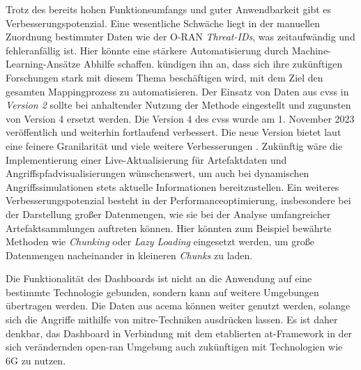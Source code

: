Trotz des bereits hohen Funktionsumfangs und guter Anwendbarkeit gibt es Verbesserungspotenzial. Eine wesentliche Schwäche liegt in der manuellen Zuordnung bestimmter Daten wie der O-RAN \textit{Threat-IDs}, was zeitaufwändig und fehleranfällig ist. Hier könnte eine stärkere Automatisierung durch Machine-Learning-Ansätze Abhilfe schaffen. \citeauthor{klementSecuring6GTransition2024} kündigen ihn \autocite{klementSecuring6GTransition2024} an, dass sich ihre zukünftigen Forschungen stark mit diesem Thema beschäftigen wird, mit dem Ziel den gesamten Mappingprozess zu automatisieren. Der Einsatz von Daten aus \gls{cvss} in \textit{Version 2} sollte bei anhaltender Nutzung der Methode eingestellt und zugunsten von Version 4 ersetzt werden. Die Version 4 des \gls{cvss} wurde am 1. November 2023 veröffentlich und weiterhin fortlaufend verbessert. Die neue Version bietet laut \citeauthor{dugalAnnouncingCVSSV40} eine feinere Granilarität und viele weitere Verbesserungen \autocite{dugalAnnouncingCVSSV40}. Zukünftig wäre die Implementierung einer Live-Aktualisierung für Artefaktdaten und Angriffspfadvisualisierungen wünschenswert, um auch bei dynamischen Angriffssimulationen stets aktuelle Informationen bereitzustellen. Ein weiteres Verbesserungspotenzial besteht in der Performanceoptimierung, insbesondere bei der Darstellung großer Datenmengen, wie sie bei der Analyse umfangreicher Artefaktsammlungen auftreten können. Hier könnten zum Beispiel bewährte Methoden wie \textit{Chunking} oder \textit{Lazy Loading} eingesetzt werden, um große Datenmengen nacheinander in kleineren \textit{Chunks} zu laden.
\par Die Funktionalität des Dashboards ist nicht an die Anwendung auf eine bestimmte Technologie gebunden, sondern kann auf weitere Umgebungen übertragen werden. Die Daten aus \gls{acema} können weiter genutzt werden, solange sich die Angriffe mithilfe von \gls{mitre}-Techniken ausdrücken lassen. Es ist daher denkbar, das Dashboard in Verbindung mit dem etablierten \gls{at}-Framework in der sich verändernden \gls{open-ran} Umgebung auch zukünftigen mit Technologien wie 6G zu nutzen.
